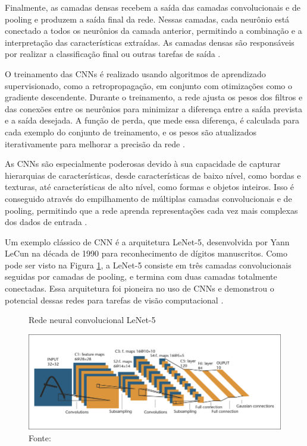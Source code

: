 Finalmente, as camadas densas recebem a saída das camadas convolucionais e de pooling e produzem a saída final da rede. Nessas camadas, cada neurônio está conectado a todos os neurônios da camada anterior, permitindo a combinação e a interpretação das características extraídas. As camadas densas são responsáveis por realizar a classificação final ou outras tarefas de saída \cite{nielsen2015neural}.


O treinamento das CNNs é realizado usando algoritmos de aprendizado supervisionado, como a retropropagação, em conjunto com otimizações como o gradiente descendente. Durante o treinamento, a rede ajusta os pesos dos filtros e das conexões entre os neurônios para minimizar a diferença entre a saída prevista e a saída desejada. A função de perda, que mede essa diferença, é calculada para cada exemplo do conjunto de treinamento, e os pesos são atualizados iterativamente para melhorar a precisão da rede \cite{aggarwal2018neural}.

As CNNs são especialmente poderosas devido à sua capacidade de capturar hierarquias de características, desde características de baixo nível, como bordas e texturas, até características de alto nível, como formas e objetos inteiros. Isso é conseguido através do empilhamento de múltiplas camadas convolucionais e de pooling, permitindo que a rede aprenda representações cada vez mais complexas dos dados de entrada \cite{goodfellow2016deep}.


Um exemplo clássico de CNN é a arquitetura LeNet-5, desenvolvida por Yann LeCun na década de 1990 para reconhecimento de dígitos manuscritos. Como pode ser visto na Figura \ref{fig:lenet5}, a LeNet-5 consiste em três camadas convolucionais seguidas por camadas de pooling, e termina com duas camadas totalmente conectadas. Essa arquitetura foi pioneira no uso de CNNs e demonstrou o potencial dessas redes para tarefas de visão computacional \cite{lecun1998gradient}.

\begin{figure}
    \centering   
    \caption{Rede neural convolucional LeNet-5}
    \includegraphics[width=\textwidth]{fig/A-Convolutional-Neural-Net-LeNet-5-From-Lecun-et-al-1998-C1998-IEEE-reprinted.png}
    \caption*{Fonte: }
    \label{fig:lenet5}
\end{figure}


